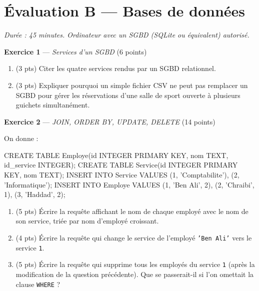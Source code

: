 \section*{Évaluation B --- Bases de données}
\textit{Durée : 45 minutes. Ordinateur avec un SGBD (SQLite ou équivalent) autorisé.}


\bigskip

\textbf{Exercice 1} --- \textit{Services d'un SGBD} \hfill (6 points)

\begin{enumerate}
  \item (3 pts) Citer les quatre services rendus par un SGBD relationnel.
  \item (3 pts) Expliquer pourquoi un simple fichier CSV ne peut pas remplacer un SGBD pour gérer les réservations d'une salle de sport ouverte à plusieurs guichets simultanément.
\end{enumerate}

\bigskip

\textbf{Exercice 2} --- \textit{JOIN, ORDER BY, UPDATE, DELETE} \hfill (14 points)

On donne :
\begin{sql}
CREATE TABLE Employe(id INTEGER PRIMARY KEY, nom TEXT, id_service INTEGER);
CREATE TABLE Service(id INTEGER PRIMARY KEY, nom TEXT);
INSERT INTO Service VALUES (1, 'Comptabilite'), (2, 'Informatique');
INSERT INTO Employe VALUES (1, 'Ben Ali', 2), (2, 'Chraibi', 1), (3, 'Haddad', 2);
\end{sql}
\begin{enumerate}
  \item (5 pts) Écrire la requête affichant le nom de chaque employé avec le nom de son service, triée par nom d'employé croissant.
  \item (4 pts) Écrire la requête qui change le service de l'employé \texttt{'Ben Ali'} vers le service \texttt{1}.
  \item (5 pts) Écrire la requête qui supprime tous les employés du service \texttt{1} (après la modification de la question précédente). Que se passerait-il si l'on omettait la clause \texttt{WHERE} ?
\end{enumerate}

